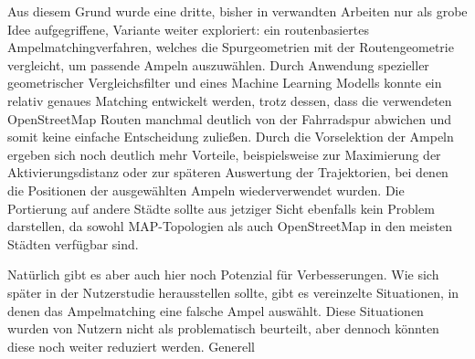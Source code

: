 Aus diesem Grund wurde eine dritte, bisher in verwandten Arbeiten nur als grobe Idee aufgegriffene, Variante weiter exploriert: ein routenbasiertes Ampelmatchingverfahren, welches die Spurgeometrien mit der Routengeometrie vergleicht, um passende Ampeln auszuwählen. Durch Anwendung spezieller geometrischer Vergleichsfilter und eines Machine Learning Modells konnte ein relativ genaues Matching entwickelt werden, trotz dessen, dass die verwendeten OpenStreetMap Routen manchmal deutlich von der Fahrradspur abwichen und somit keine einfache Entscheidung zuließen. Durch die Vorselektion der Ampeln ergeben sich noch deutlich mehr Vorteile, beispielsweise zur Maximierung der Aktivierungsdistanz oder zur späteren Auswertung der Trajektorien, bei denen die Positionen der ausgewählten Ampeln wiederverwendet wurden. Die Portierung auf andere Städte sollte aus jetziger Sicht ebenfalls kein Problem darstellen, da sowohl MAP-Topologien als auch OpenStreetMap in den meisten Städten verfügbar sind. 

Natürlich gibt es aber auch hier noch Potenzial für Verbesserungen. Wie sich später in der Nutzerstudie herausstellen sollte, gibt es vereinzelte Situationen, in denen das Ampelmatching eine falsche Ampel auswählt. Diese Situationen wurden von Nutzern nicht als problematisch beurteilt, aber dennoch könnten diese noch weiter reduziert werden. Generell 


